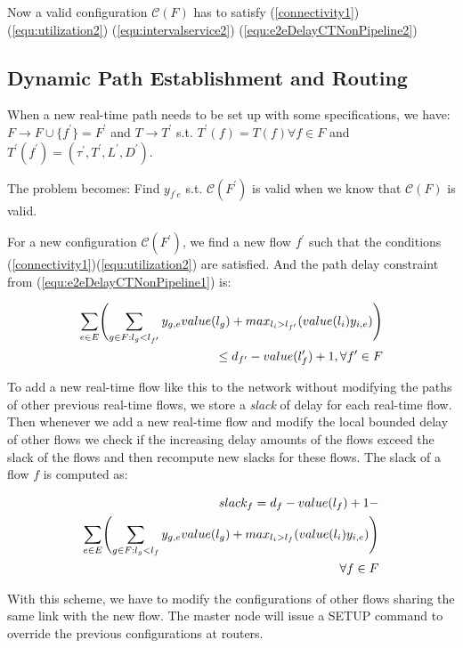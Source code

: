\documentclass[conference, twocolumn]{IEEEtran}
\theoremstyle{definition}
\begin{document}
Now a valid configuration $\mathcal{C}(F)$ has to satisfy (\ref{connectivity1}) 
(\ref{equ:utilization2})
(\ref{equ:intervalservice2}) (\ref{equ:e2eDelayCTNonPipeline2})

\subsection{Dynamic Path Establishment and Routing}
When a new real-time path needs to be set up with some specifications, we have:
$F \rightarrow F \cup \{f^{'} \}=F^{'}$
and $T \rightarrow T^{'}$ s.t. $T^{'} (f)=T(f)\forall f \in F$ and $T^{'}
(f^{'})=(\tau ^{'}, T^{'}, L^{'}, D^{'})$.

The problem becomes: Find $y_{f^{'}e}$ s.t. $\mathcal{C}(F^{'})$ is valid
when we know that $\mathcal{C}(F)$ is valid.

For a new configuration $\mathcal{C}(F^{'})$, we find a new flow $f^{'}$ such that
the conditions (\ref{connectivity1})(\ref{equ:utilization2}) are satisfied. And
the path delay constraint from (\ref{equ:e2eDelayCTNonPipeline1}) is:

\begin{eqnarray}\label{equ:e2eDelayNewPath1}
\sum_{e \in E} \Biggl(\sum_{g \in F:l_g <
l_{f'}}y_{g,e}value(l_g) +max_{l_i>l_{f'}}(value(l_i)y_{i,e})\Biggr)\notag \\
\leq d_{f'}-value(l_f') + 1, \forall f' \in F
\end{eqnarray}

To add a new real-time flow like this to the network without modifying the paths
of other previous real-time flows, we store a {\em slack} of delay for each
real-time flow. Then whenever we add a new real-time flow and modify the local
bounded delay of other flows we check if the increasing delay amounts of the
flows exceed the slack of the flows and then recompute new slacks for these
flows. The slack of a flow $f$ is computed as:

\begin{eqnarray}\label{equ:slack1}
	slack_f= d_f-value(l_f) + 1 - \notag \\
	\sum_{e \in E} \Biggl(\sum_{g \in F:l_g < l_f}y_{g,e}value(l_g)
	+max_{l_i>l_f}(value(l_i)y_{i,e})\Biggr) \notag \\ 
	\forall f \in F
\end{eqnarray}

With this scheme, we have to modify the configurations of other flows sharing
the same link with the new flow. The master node will issue a SETUP command to
override the previous configurations at routers.
\end{document}
